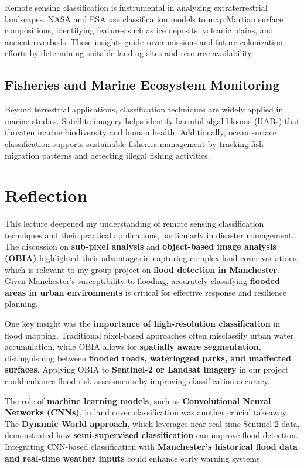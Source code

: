 \documentclass[
  letterpaper,
]{scrbook}
\begin{document}
Remote sensing classification is instrumental in analyzing
extraterrestrial landscapes. NASA and ESA use classification models to
map Martian surface compositions, identifying features such as ice
deposits, volcanic plains, and ancient riverbeds. These insights guide
rover missions and future colonization efforts by determining suitable
landing sites and resource availability.

\subsection{\texorpdfstring{\textbf{Fisheries and Marine Ecosystem
Monitoring}}{Fisheries and Marine Ecosystem Monitoring}}\label{fisheries-and-marine-ecosystem-monitoring}

Beyond terrestrial applications, classification techniques are widely
applied in marine studies. Satellite imagery helps identify harmful
algal blooms (HABs) that threaten marine biodiversity and human health.
Additionally, ocean surface classification supports sustainable
fisheries management by tracking fish migration patterns and detecting
illegal fishing activities.

\section{Reflection}\label{reflection-5}

This lecture deepened my understanding of remote sensing classification
techniques and their practical applications, particularly in disaster
management. The discussion on \textbf{sub-pixel analysis} and
\textbf{object-based image analysis (OBIA)} highlighted their advantages
in capturing complex land cover variations, which is relevant to my
group project on \textbf{flood detection in Manchester}. Given
Manchester's susceptibility to flooding, accurately classifying
\textbf{flooded areas in urban environments} is critical for effective
response and resilience planning.

One key insight was the \textbf{importance of high-resolution
classification} in flood mapping. Traditional pixel-based approaches
often misclassify urban water accumulation, while OBIA allows for
\textbf{spatially aware segmentation}, distinguishing between
\textbf{flooded roads, waterlogged parks, and unaffected surfaces}.
Applying OBIA to \textbf{Sentinel-2 or Landsat imagery} in our project
could enhance flood risk assessments by improving classification
accuracy.

The role of \textbf{machine learning models}, such as
\textbf{Convolutional Neural Networks (CNNs)}, in land cover
classification was another crucial takeaway. The \textbf{Dynamic World
approach}, which leverages near real-time Sentinel-2 data, demonstrated
how \textbf{semi-supervised classification} can improve flood detection.
Integrating CNN-based classification with \textbf{Manchester's
historical flood data and real-time weather inputs} could enhance early
warning systems.
\end{document}
